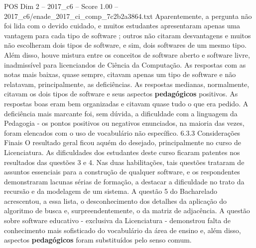 \begin{textsample}{POS Dim 2 – 2017\_c6 – Score 1.00 – 2017\_c6/enade\_2017\_ci\_comp\_7c2b2a3864.txt}
Aparentemente, a pergunta não foi lida com o devido cuidado, e muitos estudantes apresentaram apenas uma vantagem para cada tipo de software ; outros não citaram desvantagens e muitos não escolheram dois tipos de software, e sim, dois softwares de um mesmo tipo.
Além disso, houve mistura entre os conceitos de software aberto e software livre, inadmissível para licenciandos de Ciência da Computação.
As respostas com as notas mais baixas, quase sempre, citavam apenas um tipo de software e não relatavam, principalmente, as deficiências.
As respostas medianas, normalmente, citavam os dois tipos de software e seus aspectos \textbf{pedagógicos} positivos.
As respostas boas eram bem organizadas e citavam quase tudo o que era pedido.
A deficiência mais marcante foi, sem dúvida, a dificuldade com a linguagem da Pedagogia - os pontos positivos ou negativos enunciados, na maioria das vezes, foram elencados com o uso de vocabulário não específico. 6.3.3 Considerações Finais O resultado geral ficou aquém do desejado, principalmente no curso de Licenciatura.
As dificuldades dos estudantes deste curso ficaram patentes nos resultados das questões 3 e 4.
Nas duas habilitações, tais questões trataram de assuntos essenciais para a construção de qualquer software, e os respondentes demonstraram lacunas sérias de formação, a destacar a dificuldade no trato da recursão e da modelagem de um sistema.
A questão 5 do Bacharelado acrescentou, a essa lista, o desconhecimento dos detalhes da aplicação do algoritmo de busca e, surpreendentemente, o da matriz de adjacência.
A questão sobre software educativo - exclusiva da Licenciatura - demonstrou falta de conhecimento mais sofisticado do vocabulário da área de ensino e, além disso, aspectos \textbf{pedagógicos} foram substituídos pelo senso comum.

\end{textsample}
